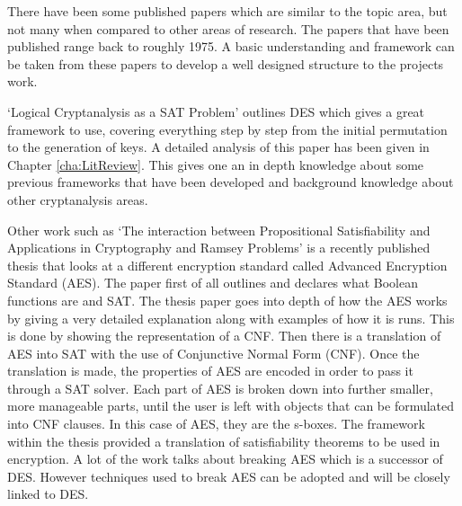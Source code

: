\documentclass[11pt,a4paper, notitlepage]{report}
\begin{document}
There have been some published papers which are similar to the topic area, but not many when compared to other areas of research. The papers that have been published range back to roughly 1975. A basic understanding and framework can be taken from these papers to develop a well designed structure to the projects work. 

`Logical Cryptanalysis as a SAT Problem' \cite{Fabio2000LogicalSAT} outlines DES which gives a great framework to use, covering everything step by step from the initial permutation to the generation of keys. A detailed analysis of this paper has been given in Chapter \ref{cha:LitReview}. This gives one an in depth knowledge about some previous frameworks that have been developed and background knowledge about other cryptanalysis areas. 

Other work such as `The interaction between Propositional Satisfiability and Applications in Cryptography and Ramsey Problems' \cite{Gwynne2010Interaction} is a recently published thesis that looks at a different encryption standard called Advanced Encryption Standard (AES). The paper first of all outlines and declares what Boolean functions are and SAT. The thesis paper goes into depth of how the AES works by giving a very detailed explanation along with examples of how it is runs. This is done by showing the representation of a CNF. Then there is a translation of AES into SAT with the use of Conjunctive Normal Form (CNF). Once the translation is made, the properties of AES are encoded in order to pass it through a SAT solver. Each part of AES is broken down into further smaller, more manageable parts, until the user is left with objects that can be formulated into CNF clauses. In this case of AES, they are the s-boxes. 
The framework within the thesis provided a translation of satisfiability theorems to be used in encryption. A lot of the work talks about breaking AES which is a successor of DES. However techniques used to break AES can be adopted and will be closely linked to DES.
\end{document}

